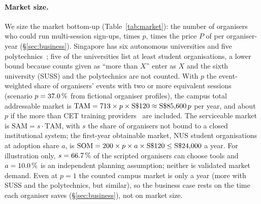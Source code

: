 \paragraph{Market size.}
We size the market bottom-up (Table~\ref{tab:market}): the number of organisers who could run
multi-session sign-ups, times $p$, times the price $P$ of  per organiser-year
(\S\ref{sec:business}). Singapore has six autonomous universities and five
polytechnics~\cite{moe-au,moe-psei}; five of the universities list at least \MarketStudentOrgs{}
student organisations, a lower bound because counts given as \enquote{more than $X$} enter as $X$
and the sixth university (SUSS) and the polytechnics are not counted. With $p$ the event-weighted share of
organisers' events with two or more equivalent sessions (scenario $p = \text{37.0}\,\%$
from \SimInterviewOrganisers{} fictional organiser profiles), the campus total addressable market is
$\text{TAM} = \text{713} \times p \times \text{S\$120} \approx
\text{S\$85{,}600}\,p$ per year, and about \sd\MarketTamCampusCetSgd\,$p$ if the more
than \MarketCetProviders{} CET training providers~\cite{ssg-credit-progress-2016} are included. The
serviceable market is $\text{SAM} = s \cdot \text{TAM}$, with $s$ the share of organisers not bound to
a closed institutional system; the first-year obtainable market, NUS student organisations at
adoption share $a$, is $\text{SOM} = \text{200} \times p \times a \times
\text{S\$120} \leq \text{S\$24{,}000}$ a year. For illustration only,
$s = 66.7\,\%$ of the scripted organisers can choose tools and $a = 10.0\,\%$
is an independent planning assumption; neither is validated market demand. Even at $p = 1$ the counted campus market is only \sd\MarketTamCampusSgd{} a year (more with SUSS
and the polytechnics, but similar), so the business case rests on the time each organiser
saves (\S\ref{sec:business}), not on market size.

